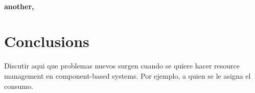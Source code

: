 \paragraph{another, \cite{Harkema:2002:PMJ:584369.584388}}

\section{Conclusions}

Discutir aqui que problemas nuevos surgen cuando se quiere hacer resource management en component-based systems. Por ejemplo, a quien se le asigna el consumo.


